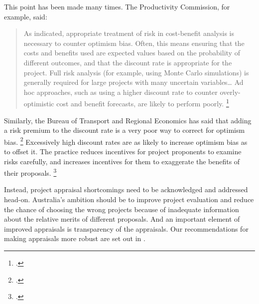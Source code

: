 \documentclass{grattan}
\begin{document}
This point has been made many times. The Productivity Commission, for example, said:

\begin{quote}As indicated, appropriate treatment of risk in cost-benefit analysis is necessary to counter optimism bias. Often, this means ensuring that the costs and benefits used are expected values based on the probability of different outcomes, and that the discount rate is appropriate for the project. Full risk analysis (for example, using Monte Carlo simulations) is generally required for large projects with many uncertain variables\dots{}  Ad hoc approaches, such as using a higher discount rate to counter overly-optimistic cost and benefit forecasts, are likely to perform poorly.%
    \footcite[][102]{Commission2014PublicInfastructure}
\end{quote}


Similarly, the Bureau of Transport and Regional Economics has said that adding a risk premium to the discount rate is a very poor way to correct for optimism bias.%
\footcite[][ix]{BITRE2005RiskinCostBenefitAnalysis}
Excessively high discount rates are as likely to increase optimism bias as to offset it. The practice reduces incentives for project proponents to examine risks carefully, and increases incentives for them to exaggerate the benefits of their proposals.%
\footcite[][475--476]{Spackman-2004-time-discounting-fiscal-studies}

Instead, project appraisal shortcomings need to be acknowledged and addressed head-on. Australia's ambition should be to improve project evaluation and reduce the chance of choosing the wrong projects because of inadequate information about the relative merits of different proposals. And an important element of improved appraisals is transparency of the appraisals. Our recommendations for making appraisals more robust are set out in .
\end{document}
